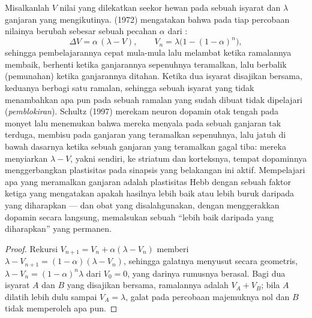 \begin{proposition}\label{prop:b3:learning-memory:rescorla}
Misalkanlah $V$ nilai yang dilekatkan seekor hewan pada sebuah isyarat dan $\lambda$
ganjaran yang mengikutinya.  (1972) mengatakan bahwa pada
tiap percobaan nilainya berubah sebesar sebuah pecahan $\alpha$ dari
\emph{}:
\[
\Delta V = \alpha\,(\lambda - V), \qquad
V_{n} = \lambda\bigl(1 - (1-\alpha)^{n}\bigr) ,
\]
sehingga pembelajarannya cepat mula-mula lalu melambat ketika ramalannya membaik,
berhenti ketika ganjarannya sepenuhnya teramalkan, lalu berbalik (pemunahan)
ketika ganjarannya ditahan. Ketika dua isyarat disajikan bersama, keduanya
berbagi satu ramalan, sehingga sebuah isyarat yang tidak menambahkan apa pun pada sebuah ramalan
yang sudah dibuat tidak dipelajari (\emph{pemblokiran}). Schultz (1997) merekam
neuron dopamin otak tengah pada monyet lalu menemukan bahwa mereka menyala
pada sebuah ganjaran tak terduga, membisu pada ganjaran yang teramalkan sepenuhnya, lalu jatuh
di bawah dasarnya ketika sebuah ganjaran yang teramalkan gagal tiba: mereka menyiarkan
$\lambda - V$, yakni  sendiri, ke striatum dan korteksnya,
tempat dopaminnya menggerbangkan plastisitas pada sinapsis yang belakangan ini
aktif. Mempelajari apa yang meramalkan ganjaran adalah plastisitas Hebb dengan sebuah
faktor ketiga yang mengatakan apakah hasilnya lebih baik atau lebih buruk daripada yang
diharapkan --- dan obat yang disalahgunakan, dengan menggerakkan dopamin secara langsung,
memalsukan sebuah ``lebih baik daripada yang diharapkan'' yang permanen.
\end{proposition}
\begin{proof}
Rekursi $V_{n+1} = V_{n} + \alpha(\lambda - V_{n})$ memberi
$\lambda - V_{n+1} = (1-\alpha)(\lambda - V_{n})$, sehingga galatnya menyusut
secara geometris, $\lambda - V_{n} = (1-\alpha)^{n}\lambda$ dari $V_{0} =
0$, yang darinya rumusnya berasal. Bagi dua isyarat $A$ dan $B$ yang disajikan bersama,
ramalannya adalah $V_{A} + V_{B}$; bila $A$ dilatih lebih dulu sampai
$V_{A} = \lambda$, galat pada percobaan majemuknya nol dan $B$
tidak memperoleh apa pun.
\end{proof}

